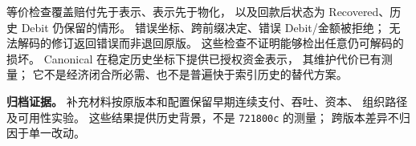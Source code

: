 等价检查覆盖赔付先于表示、表示先于物化，
以及回款后状态为 Recovered、历史 Debit 仍保留的情形。
错误坐标、跨前缀决定、错误 Debit/金额被拒绝；
无法解码的修订返回错误而非退回原版。
这些检查不证明能够检出任意仍可解码的损坏。
Canonical 在稳定历史坐标下提供已授权资金表示，
其维护代价已有测量；
它不是经济闭合所必需、也不是普遍快于索引历史的替代方案。

\noindent\textbf{归档证据。}
补充材料按原版本和配置保留早期连续支付、吞吐、资本、
组织路径及可用性实验。
这些结果提供历史背景，不是 \texttt{721800c} 的测量；
跨版本差异不归因于单一改动。